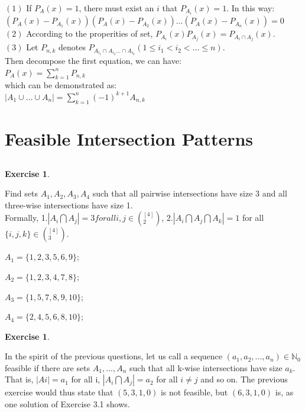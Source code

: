\documentclass[12pt,a4]{article}
\newtheorem{exercise}[theorem]{Exercise}
\begin{document}
\begin{enumerate}
    $(1)$ If $P_A(x) = 1$, there must exist an $i$ that $P_{A_i}(x) = 1$. In this way:\\
    $(P_A(x) - P_{A_1}(x))(P_A(x) - P_{A_2}(x))\ldots(P_A(x) - P_{A_n}(x)) = 0$\\

    $(2)$ According to the properities of set, $P_{A_i}(x)P_{A_j}(x) = P_{A_i \cap A_j}(x)$.\\

    $(3)$ Let $P_{n,k}$ denotes $P_{A_{i_1}\cap A_{i_2}\ldots\cap A_{i_k}}(1\le i_1<i_2<\ldots\le n)$.\\
    Then decompose the first equation, we can have:\\
    $P_A(x) = \sum\limits_{k=1}^{n}P_{n,k}$\\
    which can be demonstrated as:\\
     $\left\vert{A_1\cup\ldots\cup A_n}\right\vert = \sum\limits_{k=1}^{n}(-1)^{k+1}A_{n,k}$\\
\end{enumerate}

\section{Feasible Intersection Patterns}

\subsection{}

\begin{exercise}
\end{exercise}
  Find sets $A_1, A_2, A_3, A_4$ such that all pairwise intersections have size 3 and all three-wise intersections have size 1. \\Formally,
 1.$|A_i\bigcap A_j| = 3 for all {i,j} \in (^{[4]}_{2})$,
 2.$|A_i\bigcap A_j\bigcap A_k| = 1$ for all $\{i,j,k\}\in (^{[4]}_{3})$.

    
    
    $A_1=\{1,2,3,5,6,9\}$;
    
    $A_2=\{1,2,3,4,7,8\}$;
    
    $A_3=\{1,5,7,8,9,10\}$;
    
    $A_4=\{2,4,5,6,8,10\}$;
    
\begin{exercise}
\end{exercise}
	In the spirit of the previous questions, let us call a sequence $(a_1,a_2,...,a_n)\in\mathbb{N}_0$ feasible if there are sets $A_1,...,A_n$ such that all k-wise intersections have size $a_k$. That is, $|Ai| = a_{1}$ for all i, $|A_i \bigcap A_j| = a_2$ for all $i \not= j$ and so on. The previous exercise would thus state that $(5, 3, 1, 0)$ is not feasible, but $(6, 3, 1, 0)$ is, as one solution of Exercise 3.1 shows.
\end{document}
